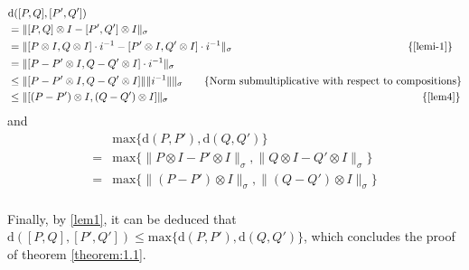 \begin{equation} \label{eq:proof_theorem1.1_esq}
  \begin{split}
    & \text{d} ([P,Q],[P',Q'])  \\
    &=  \lVert  [P,Q] \otimes I - [P',Q'] \otimes I   \rVert_{\sigma}  \\
    &=   \lVert [P \otimes I, Q \otimes I] \cdot i^{-1}  - [P' \otimes I, Q' \otimes I]  \cdot i^{-1}  \rVert_{\sigma}   \hspace{165pt}  \text{\{\autoref{lemi-1}\}} \\
    &=  \lVert [P - P' \otimes I, Q-Q' \otimes I] \cdot i^{-1}  \rVert_{\sigma}   \\
    & \leq \lVert [P - P' \otimes I, Q-Q' \otimes I]  \rVert \lVert i^{-1}  \rVert \rVert_{\sigma} \hspace{20pt} \text{\{Norm submultiplicative with respect to compositions\}}  \\  
    & \leq \lVert [(P - P') \otimes I, (Q-Q') \otimes I]  \rVert_{\sigma} \hspace{235pt} \text{ \{\autoref{lem4}\}} \\
  \end{split}
  \end{equation}
and
\begin{equation} \label {eq:proof_theorem1.1_dir}
\begin{split}
   &  \text{max} \{\text{d} (P,P'),\text{d} (Q,Q')\} \\
   = &  \text{max}\{ \lVert P \otimes I - P' \otimes I \rVert_{\sigma}, \lVert Q \otimes I - Q'\otimes I \rVert_{\sigma} \}\\
   = &  \text{max}\{ \lVert (P - P') \otimes I \rVert_{\sigma}, \lVert (Q - Q') \otimes I \rVert_{\sigma} \}\\
\end{split}
\end{equation}

Finally, by  \autoref{lem1}, it can be deduced that $\text{d} ([P,Q],[P',Q']) \leq \text{max} \{\text{d} (P,P'),\text{d} (Q,Q')\}$, which concludes the proof of theorem \autoref{theorem:1.1}.

\vspace{10pt}

